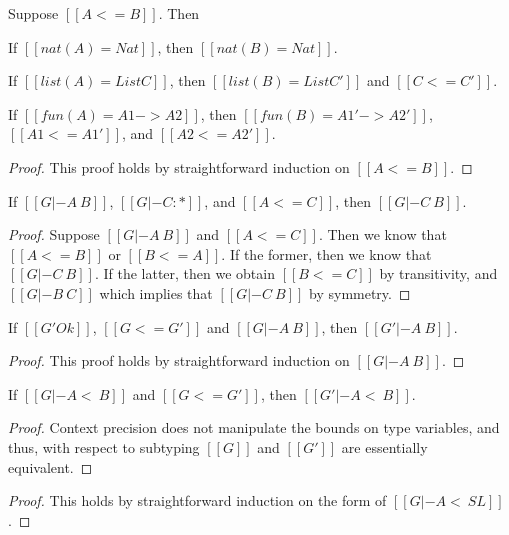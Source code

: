 \begin{lemma}
  \label{lemma:fun_type_pre}
  Suppose $[[A <= B]]$.  Then
  \begin{enumR}
  \item If $[[nat(A) = Nat]]$, then $[[nat(B) = Nat]]$.    
  \item If $[[list(A) = List C]]$, then $[[list(B) = List C']]$ and $[[C <= C']]$.
  \item If $[[fun(A) = A1 -> A2]]$, then $[[fun(B) = A1' -> A2']]$, $[[A1 <= A1']]$, and $[[A2 <= A2']]$.
  \end{enumR}
\end{lemma}
\begin{proof}
  This proof holds by straightforward induction on $[[A <= B]]$.
\end{proof}

\begin{lemma}
  \label{lemma:type_cons_type_pre_2}
  If $[[G |- A ~ B]]$, $[[G |- C : *]]$, and $[[A <= C]]$, then $[[G |- C ~ B]]$.
\end{lemma}
\begin{proof}
  Suppose $[[G |- A ~ B]]$ and $[[A <= C]]$.  Then we know
  that $[[A <= B]]$ or $[[B <= A]]$.  If the former, then
  we know that $[[G |- C ~ B]]$.  If the latter, then
  we obtain $[[B <= C]]$ by transitivity, and $[[G |- B ~ C]]$
  which implies that $[[G |- C ~ B]]$ by symmetry.
\end{proof}

\begin{lemma}
  \label{lemma:type_cons_ctx_pre}
  If $[[G' Ok]]$, $[[G <= G']]$ and $[[G |- A ~ B]]$, then $[[G' |- A ~ B]]$.
\end{lemma}
\begin{proof}
  This proof holds by straightforward induction on $[[G |- A ~ B]]$. 
\end{proof}

\begin{lemma}
  \label{lemma:subtyping_context_precision}
  If $[[G |- A <~ B]]$ and $[[G <= G']]$, then $[[G' |- A <~ B]]$.
\end{lemma}
\begin{proof}
  Context precision does not manipulate the bounds on type variables, and thus,
  with respect to subtyping $[[G]]$ and $[[G']]$ are essentially equivalent.
\end{proof}

\begin{proof}
  This holds by straightforward induction on the form of $[[G |- A <~ SL]]$.
\end{proof}

